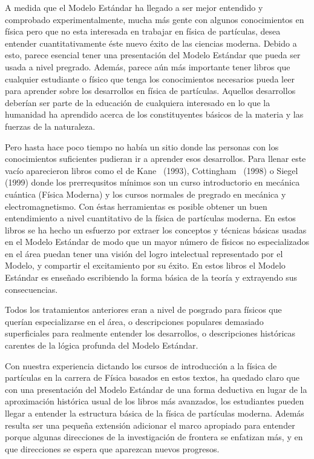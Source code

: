 A medida que el Modelo Estándar ha llegado a ser mejor entendido y comprobado experimentalmente, mucha más gente con algunos conocimientos en física pero que no esta interesada en trabajar en física de partículas, desea entender cuantitativamente éste nuevo éxito de las ciencias moderna. Debido a esto, parece esencial tener una presentación del Modelo Estándar que pueda ser usada a nivel pregrado. Además, parece aún más importante tener libros que cualquier estudiante o físico que tenga los conocimientos necesarios pueda leer para aprender sobre los desarrollos en física de partículas. Aquellos desarrollos deberían ser parte de la educación de cualquiera interesado en lo que la humanidad ha aprendido acerca de los constituyentes básicos de la materia y las fuerzas de la naturaleza. 

Pero hasta hace poco tiempo no había un sitio donde las personas con los conocimientos suficientes pudieran ir a aprender esos desarrollos. Para llenar este vacío aparecieron libros como el de Kane~\cite{kane} (1993), Cottingham~\cite{cottingham} (1998) o Siegel~\cite{Siegel} (1999) donde los prerrequsitos mínimos son un curso introductorio en mecánica cuántica (Física Moderna) y los cursos normales de pregrado en mecánica y electromagnetismo. Con éstas herramientas es posible obtener un buen entendimiento a nivel cuantitativo de la física de partículas moderna. En estos libros se ha hecho un esfuerzo por extraer los conceptos y técnicas básicas usadas en el Modelo Estándar de modo que un mayor número de físicos no especializados en el área puedan tener una visión del logro intelectual representado por el Modelo, y compartir el excitamiento por su éxito. En estos libros el Modelo Estándar es ense\~nado escribiendo la forma básica de la teoría y extrayendo sus consecuencias. 

Todos los tratamientos anteriores eran a nivel de posgrado  para físicos que querían especializarse en el área, o descripciones populares demasiado superficiales para realmente entender los desarrollos, o descripciones históricas carentes de la lógica profunda del Modelo Estándar. 

Con nuestra experiencia dictando los cursos de introducción a la física de partículas en la carrera de Física basados en estos textos, ha quedado claro que con una presentación del Modelo Estándar de una forma deductiva en lugar de la aproximación histórica usual de los libros más avanzados, los estudiantes pueden llegar a entender la estructura básica de la física de partículas moderna. Además resulta ser una peque\~na extensión adicionar el marco apropiado para entender porque algunas direcciones de la investigación de frontera se enfatizan más, y en que direcciones se espera que aparezcan nuevos progresos.

